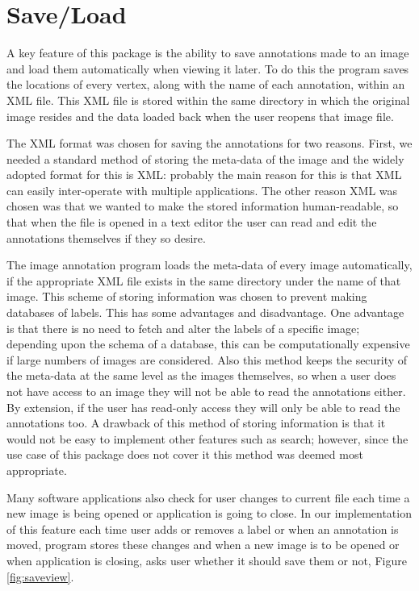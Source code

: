 \section{Save\slash Load}
A key feature of this package is the ability to save annotations made to an image and load them automatically when viewing it later. To do this the program saves the locations of every vertex, along with the name of each annotation, within an XML file.  This XML file is stored within the same directory in which the original image resides and the data loaded back when the user reopens that image file.

The XML format was chosen for saving the annotations for two reasons. First, we needed a standard method of storing the meta-data of the image and the widely adopted format for this is XML: probably the main reason for this is that XML can easily inter-operate with multiple applications.  The other reason XML was chosen was that we wanted to make the stored information human-readable, so that when the file is opened in a text editor the user can read and edit the annotations themselves if they so desire.

The image annotation program loads the meta-data of every image automatically, if the appropriate XML file exists in the same directory under the name of that image. This scheme of storing information was chosen to prevent making databases of labels. This has some advantages and disadvantage. One advantage is that there is no need to fetch and alter the labels of a specific image; depending upon the schema of a database, this can be computationally expensive if large numbers of images are considered. Also this method keeps the security of the meta-data at the same level as the images themselves, so when a user does not have access to an image they will not be able to read the annotations either.  By extension, if the user has read-only access they will only be able to read the annotations too. A drawback of this method of storing information is that it would not be easy to implement other features such as search; however, since the use case of this package does not cover it this method was deemed most appropriate.

Many software applications also check for user changes to current file each time a new image is being opened or application is going to close. In our implementation of this feature each time user adds or removes a label or when an annotation is moved, program stores these changes and when a new image is to be opened or when application is closing, asks user whether it should save them or not, Figure \ref{fig:saveview}.

